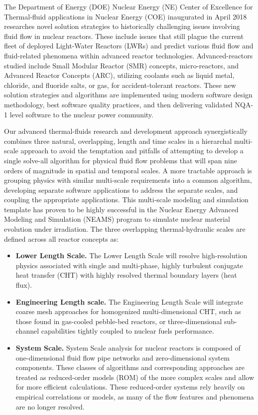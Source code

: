 The Department of Energy (DOE) Nuclear Energy (NE) Center of Excellence for Thermal-fluid applications in Nuclear Energy (COE) \cite{shaver2019initial} inaugurated in April 2018 researches novel solution strategies to historically challenging issues involving fluid flow in nuclear reactors. These include issues that still plague the current fleet of deployed Light-Water Reactors (LWRs) and predict various fluid flow and fluid-related phenomena within advanced reactor technologies. Advanced-reactors studied include Small Modular Reactor (SMR) concepts, micro-reactors, and Advanced Reactor Concepts (ARC), utilizing coolants such as liquid metal, chloride, and fluoride salts, or gas, for accident-tolerant reactors. These new solution strategies and algorithms are implemented using modern software design methodology, best software quality practices, and then delivering validated NQA-1 level software to the nuclear power community.

Our advanced thermal-fluids research and development approach synergistically combines three natural, overlapping, length and time scales in a hierarchal multi-scale approach to avoid the temptation and
pitfalls of attempting to develop a single solve-all algorithm for physical fluid flow problems that will span nine orders of magnitude in spatial and temporal scales. A more tractable approach is grouping physics with similar multi-scale requirements into a common algorithm, developing separate software applications to address the separate scales, and coupling the appropriate applications. This multi-scale modeling and simulation template has proven to be highly successful in the Nuclear Energy Advanced Modeling and Simulation (NEAMS) program to simulate nuclear material evolution under irradiation. The three overlapping thermal-hydraulic scales are defined across all reactor concepts as:
\begin{itemize}
    \item \textbf{Lower Length Scale.} The Lower Length Scale will resolve high-resolution physics
    associated with single and multi-phase, highly turbulent conjugate heat transfer (CHT) with highly
    resolved thermal boundary layers (heat flux).
    \item \textbf{Engineering Length scale.} The Engineering Length Scale will integrate coarse mesh approaches
    for homogenized multi-dimensional CHT, such as those found in gas-cooled pebble-bed reactors, or three-dimensional sub-channel capabilities tightly coupled to nuclear fuels performance.
    \item \textbf{System Scale.} System Scale analysis for nuclear reactors is composed of one-dimensional fluid flow
    pipe networks and zero-dimensional system components. These classes of algorithms and corresponding approaches are treated as reduced-order models (ROM) of the more complex scales and allow for more efficient calculations. These reduced-order systems rely heavily on empirical correlations or models, as many of the flow features and phenomena are no longer resolved.
\end{itemize}

